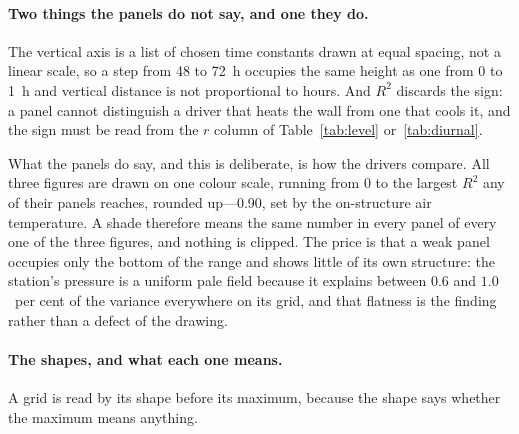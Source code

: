 \documentclass[11pt,a4paper]{article}
\begin{document}
\paragraph{Two things the panels do not say, and one they do.} The vertical
axis is a list of chosen time constants drawn at equal spacing, not a linear
scale, so a step from 48 to 72~h occupies the same height as one from 0 to 1~h
and vertical distance is not proportional to hours. And $R^2$ discards the sign:
a panel cannot distinguish a driver that heats the wall from one that cools it,
and the sign must be read from the $r$ column of Table~\ref{tab:level}
or~\ref{tab:diurnal}.

What the panels do say, and this is deliberate, is how the drivers compare. All
three figures are drawn on one colour scale, running from 0 to the largest
$R^2$ any of their panels reaches, rounded up---0.90, set by the on-structure
air temperature. A shade therefore means the same number in every panel of
every one of the three figures, and nothing is clipped. The price is that a weak
panel occupies only the bottom of the range and shows little of its own
structure: the station's pressure is a uniform pale field because it explains
between $0.6$ and $1.0$~per cent of the variance everywhere on its grid, and
that flatness is the finding rather than a defect of the drawing.

\paragraph{The shapes, and what each one means.} A grid is read by its shape
before its maximum, because the shape says whether the maximum means anything.
\end{document}
